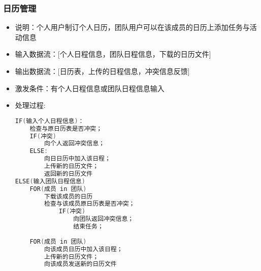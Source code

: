 \begin{itemize}
            \subsubsection{日历管理}
            \begin{itemize}
                \item 说明：个人用户制订个人日历，团队用户可以在该成员的日历上添加任务与活动信息
                \item 输入数据流：[个人日程信息，团队日程信息，下载的日历文件]
                \item 输出数据流：[日历表，上传的日程信息，冲突信息反馈]
                \item 激发条件：有个人日程信息或团队日程信息输入
                \item 处理过程:
\begin{lstlisting}[language=C, caption=日历管理, label={code:first-code}]
IF(输入个人日程信息)：
    检查与原日历表是否冲突；
    IF(冲突) 
        向个人返回冲突信息；
    ELSE:
        向日日历中加入该日程；
        上传新的日历文件；
        返回新的日历文件
ELSE(输入团队日程信息)
    FOR(成员 in 团队)
        下载该成员的日历
        检查与该成员原日历表是否冲突；
            IF(冲突) 
                向团队返回冲突信息；
                结束任务；
                    
    FOR(成员 in 团队)
        向该成员日历中加入该日程；
        上传新的日历文件；
        向该成员发送新的日历文件
\end{lstlisting}
            \end{itemize}

\end{itemize}
